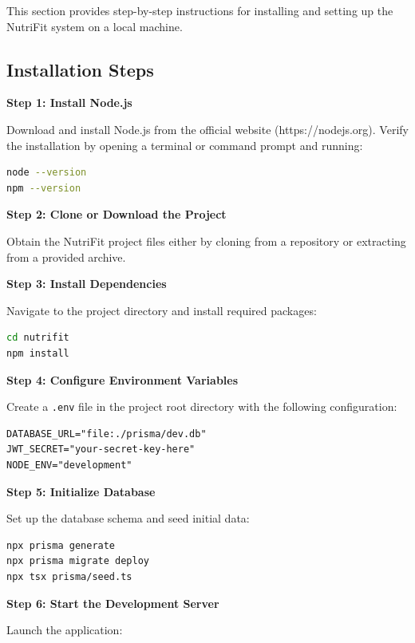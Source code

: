 This section provides step-by-step instructions for installing and setting up the NutriFit system on a local machine.

\subsection{Installation Steps}

\textbf{Step 1: Install Node.js}

Download and install Node.js from the official website (https://nodejs.org). Verify the installation by opening a terminal or command prompt and running:

\begin{lstlisting}[language=bash, caption=Verify Node.js Installation]
node --version
npm --version
\end{lstlisting}

\textbf{Step 2: Clone or Download the Project}

Obtain the NutriFit project files either by cloning from a repository or extracting from a provided archive.

\textbf{Step 3: Install Dependencies}

Navigate to the project directory and install required packages:

\begin{lstlisting}[language=bash, caption=Install Project Dependencies]
cd nutrifit
npm install
\end{lstlisting}

\textbf{Step 4: Configure Environment Variables}

Create a \texttt{.env} file in the project root directory with the following configuration:

\begin{lstlisting}[caption=Environment Configuration]
DATABASE_URL="file:./prisma/dev.db"
JWT_SECRET="your-secret-key-here"
NODE_ENV="development"
\end{lstlisting}

\textbf{Step 5: Initialize Database}

Set up the database schema and seed initial data:

\begin{lstlisting}[language=bash, caption=Database Setup]
npx prisma generate
npx prisma migrate deploy
npx tsx prisma/seed.ts
\end{lstlisting}

\textbf{Step 6: Start the Development Server}

Launch the application:

